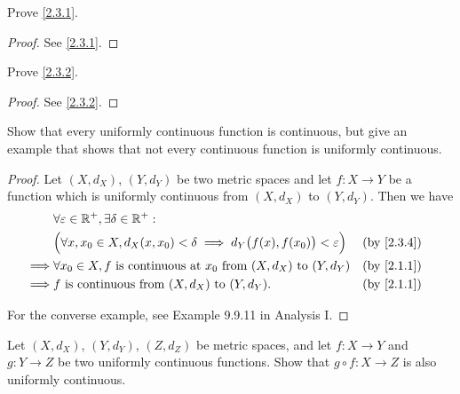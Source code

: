 \exercisesection

\begin{ex}\label{ex:2.3.1}
  Prove \cref{2.3.1}.
\end{ex}

\begin{proof}
  See \cref{2.3.1}.
\end{proof}

\begin{ex}\label{ex:2.3.2}
  Prove \cref{2.3.2}.
\end{ex}

\begin{proof}
  See \cref{2.3.2}.
\end{proof}

\begin{ex}\label{ex:2.3.3}
  Show that every uniformly continuous function is continuous, but give an example that shows that not every continuous function is uniformly continuous.
\end{ex}

\begin{proof}
  Let \((X, d_X)\), \((Y, d_Y)\) be two metric spaces and let \(f : X \to Y\) be a function which is uniformly continuous from \((X, d_X)\) to \((Y, d_Y)\).
  Then we have
  \begin{align*}
             & \forall \varepsilon \in \R^+, \exists \delta \in \R^+ :                                                               \\
             & \Big(\forall x, x_0 \in X, d_X(x, x_0) < \delta \implies d_Y\big(f(x), f(x_0)\big) < \varepsilon\Big) &  & \by{2.3.4} \\
    \implies & \forall x_0 \in X, f \text{ is continuous at } x_0 \text{ from } (X, d_X) \text{ to } (Y, d_Y)        &  & \by{2.1.1} \\
    \implies & f \text{ is continuous from } (X, d_X) \text{ to } (Y, d_Y).                                          &  & \by{2.1.1}
  \end{align*}

  For the converse example, see Example 9.9.11 in Analysis I.
\end{proof}

\begin{ex}\label{ex:2.3.4}
  Let \((X, d_X)\), \((Y, d_Y)\), \((Z, d_Z)\) be metric spaces, and let \(f : X \to Y\) and \(g : Y \to Z\) be two uniformly continuous functions.
  Show that \(g \circ f : X \to Z\) is also uniformly continuous.
\end{ex}

